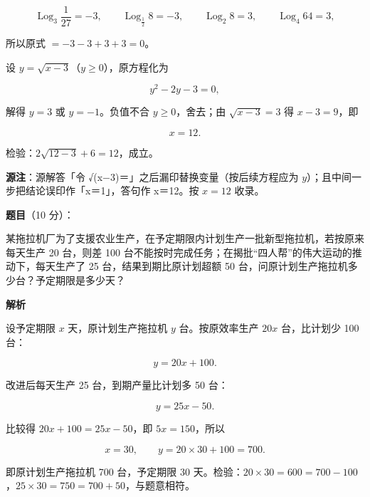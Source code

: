 \begin{answer}
\nopagebreak[4]
\[
\operatorname{Log}_3\frac{1}{27}=-3,\qquad
\operatorname{Log}_{\frac12}8=-3,\qquad
\operatorname{Log}_2 8=3,\qquad
\operatorname{Log}_4 64=3,
\]

所以原式 $=-3-3+3+3=0$。


设 $y=\sqrt{x-3}$（$y\ge0$），原方程化为

\nopagebreak[4]
\[
y^{2}-2y-3=0,
\]

解得 $y=3$ 或 $y=-1$。负值不合 $y\ge0$，舍去；由 $\sqrt{x-3}=3$ 得 $x-3=9$，即

\nopagebreak[4]
\[
x=12.
\]

检验：$2\sqrt{12-3}+6=12$，成立。

\begin{gktip}
\textbf{源注}：源解答「令 √(x$-$3)＝」之后漏印替换变量（按后续方程应为 $y$）；且中间一步把结论误印作「x＝1」，答句作 x＝12。按 $x=12$ 收录。
\end{gktip}





\end{answer}
\begin{answer}

\textbf{题目}（10 分）：

某拖拉机厂为了支援农业生产，在予定期限内计划生产一批新型拖拉机，若按原来每天生产 20 台，则差 100 台不能按时完成任务；在揭批“四人帮”的伟大运动的推动下，每天生产了 25 台，结果到期比原计划超额 50 台，问原计划生产拖拉机多少台？予定期限是多少天？

\textbf{解析}

设予定期限 $x$ 天，原计划生产拖拉机 $y$ 台。按原效率生产 $20x$ 台，比计划少 100 台：

\nopagebreak[4]
\[
y=20x+100.
\]

改进后每天生产 25 台，到期产量比计划多 50 台：

\nopagebreak[4]
\[
y=25x-50.
\]

比较得 $20x+100=25x-50$，即 $5x=150$，所以

\nopagebreak[4]
\[
x=30,\qquad y=20\times30+100=700.
\]

即原计划生产拖拉机 700 台，予定期限 30 天。检验：$20\times30=600=700-100$，$25\times30=750=700+50$，与题意相符。


\end{answer}
